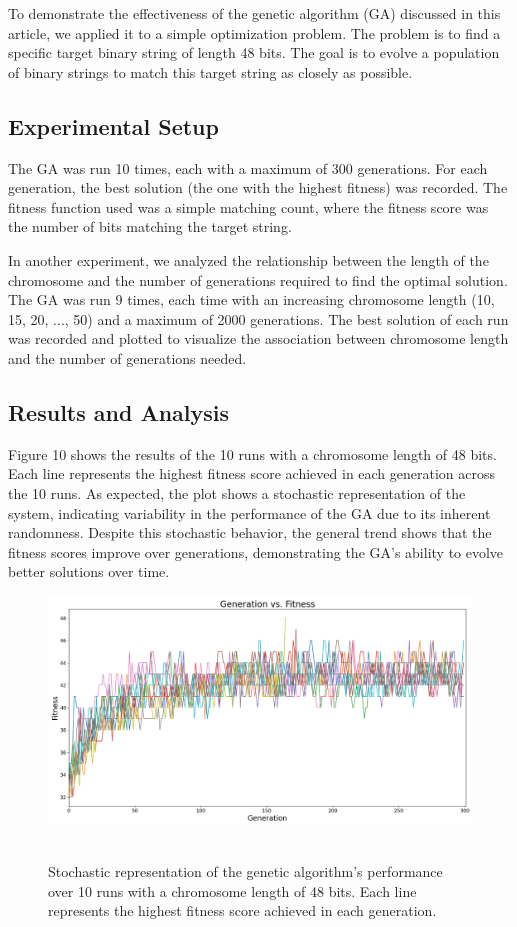 \documentclass[12pt]{article}
\begin{document}
To demonstrate the effectiveness of the genetic algorithm (GA) discussed in this article, we applied it to a simple optimization problem. The problem is to find a specific target binary string of length 48 bits. The goal is to evolve a population of binary strings to match this target string as closely as possible.

\subsection{Experimental Setup}

The GA was run 10 times, each with a maximum of 300 generations. For each generation, the best solution (the one with the highest fitness) was recorded. The fitness function used was a simple matching count, where the fitness score was the number of bits matching the target string.

In another experiment, we analyzed the relationship between the length of the chromosome and the number of generations required to find the optimal solution. The GA was run 9 times, each time with an increasing chromosome length (10, 15, 20, ..., 50) and a maximum of 2000 generations. The best solution of each run was recorded and plotted to visualize the association between chromosome length and the number of generations needed.

\subsection{Results and Analysis}

Figure 10 shows the results of the 10 runs with a chromosome length of 48 bits. Each line represents the highest fitness score achieved in each generation across the 10 runs. As expected, the plot shows a stochastic representation of the system, indicating variability in the performance of the GA due to its inherent randomness. Despite this stochastic behavior, the general trend shows that the fitness scores improve over generations, demonstrating the GA's ability to evolve better solutions over time.

\begin{figure}[H]
\centering
\includegraphics[scale=0.60]{stochastic_effect}\
\caption{Stochastic representation of the genetic algorithm's performance over 10 runs with a chromosome length of 48 bits. Each line represents the highest fitness score achieved in each generation.}
\end{figure}
\end{document}
